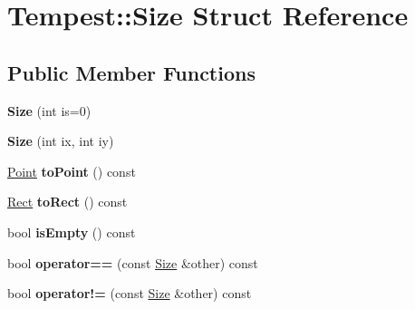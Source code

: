 \hypertarget{struct_tempest_1_1_size}{\section{Tempest\+:\+:Size Struct Reference}
\label{struct_tempest_1_1_size}
}
\subsection*{Public Member Functions}
\begin{DoxyCompactItemize}
\item 
\hypertarget{struct_tempest_1_1_size_a5f65b73d4134cabea0f8fba29e5ff083}{{\bfseries Size} (int is=0)}\label{struct_tempest_1_1_size_a5f65b73d4134cabea0f8fba29e5ff083}

\item 
\hypertarget{struct_tempest_1_1_size_a1b6db7384a71e6fecfc2344ee430cf89}{{\bfseries Size} (int ix, int iy)}\label{struct_tempest_1_1_size_a1b6db7384a71e6fecfc2344ee430cf89}

\item 
\hypertarget{struct_tempest_1_1_size_a1b51aab0763e8dde91b0311b30581944}{\hyperlink{struct_tempest_1_1_point}{Point} {\bfseries to\+Point} () const }\label{struct_tempest_1_1_size_a1b51aab0763e8dde91b0311b30581944}

\item 
\hypertarget{struct_tempest_1_1_size_aa62bb68cfa605f22ec45ebeace215909}{\hyperlink{struct_tempest_1_1_rect}{Rect} {\bfseries to\+Rect} () const }\label{struct_tempest_1_1_size_aa62bb68cfa605f22ec45ebeace215909}

\item 
\hypertarget{struct_tempest_1_1_size_adafc0946bff86128c8467c2f5b09a01e}{bool {\bfseries is\+Empty} () const }\label{struct_tempest_1_1_size_adafc0946bff86128c8467c2f5b09a01e}

\item 
\hypertarget{struct_tempest_1_1_size_a11cb27cff6cc1767a76fec0e1f5dd4d2}{bool {\bfseries operator==} (const \hyperlink{struct_tempest_1_1_size}{Size} \&other) const }\label{struct_tempest_1_1_size_a11cb27cff6cc1767a76fec0e1f5dd4d2}

\item 
\hypertarget{struct_tempest_1_1_size_aa0ebaa2aadfd83fb3ccc8427d2511205}{bool {\bfseries operator!=} (const \hyperlink{struct_tempest_1_1_size}{Size} \&other) const }\label{struct_tempest_1_1_size_aa0ebaa2aadfd83fb3ccc8427d2511205}

\end{DoxyCompactItemize}
